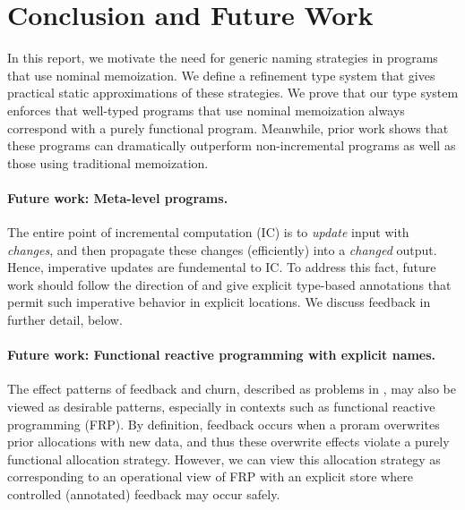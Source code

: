 \documentclass{purple}
\begin{document}
\section{Conclusion and Future Work}
\label{sec:futurework}
\label{sec:conclusion}


In this report, we motivate the need for generic naming strategies in
programs that use nominal memoization.
%
We define a refinement type system that gives practical static
approximations of these strategies.
%
We prove that our type system enforces that well-typed programs that
use nominal memoization always correspond with a purely functional
program.
%
Meanwhile, prior work shows that these programs can dramatically
outperform non-incremental programs as well as those using traditional
memoization.

\paragraph{Future work: Meta-level programs.}
%
The entire point of incremental computation (IC) is to \emph{update}
input with \emph{changes}, and then propagate these changes
(efficiently) into a \emph{changed} output.
%
Hence, imperative updates are fundemental to IC.
%
To address this fact, future work should follow the direction of
\cite{Adapton2014} and give explicit type-based annotations that
permit such imperative behavior in explicit locations.
%
We discuss feedback in further detail, below.

\paragraph{Future work: Functional reactive programming with explicit names.}
%
The effect patterns of feedback and churn, described as problems in
, may also be viewed as desirable patterns,
especially in contexts such as functional reactive programming (FRP).
%
By definition, feedback occurs when a proram overwrites prior
allocations with new data, and thus these overwrite effects violate a
purely functional allocation strategy.
%
However, we can view this allocation strategy as corresponding to an
operational view of FRP with an explicit store where controlled
(annotated) feedback may occur safely.
\end{document}
